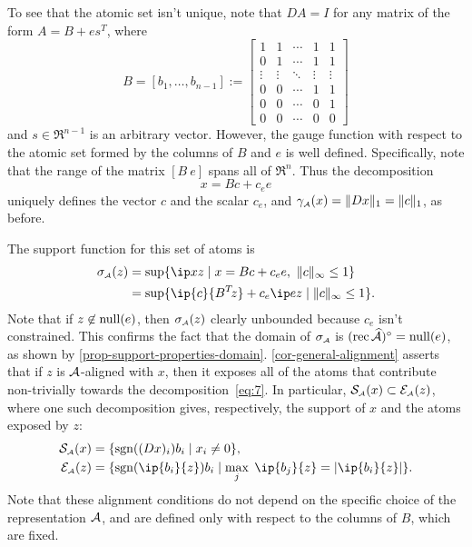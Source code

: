 \begin{example}
To see that the atomic set isn't unique, note that $DA = I$ for
any matrix of the form $A = B+es^T$, where 
\begin{equation*}
B = [b_1,\ldots,b_{n-1}] := \begin{bmatrix}
1 & 1 & \cdots & 1&1\\
0 & 1  & \cdots & 1&1 \\
\vdots  & \vdots & \ddots & \vdots  &\vdots\\
0 & 0  & \cdots & 1 & 1\\
0 & 0  & \cdots & 0 & 1\\
0 & 0  & \cdots & 0 & 0
\end{bmatrix}
\end{equation*}
and $s\in \Re^{n-1}$ is an arbitrary vector.  However, the gauge
function with respect to the atomic set formed by the columns of $B$ and $e$ 
is well defined. Specifically, note that the range of the matrix $[B\ e]$
spans all of $\Re^n$. Thus the decomposition
\begin{equation}\label{eq:7}
  x = Bc+c_ee
\end{equation}
uniquely defines the vector $c$ and the scalar $c_e$, and
$\gamma_{\scriptscriptstyle\mathcal{A}}(x) = \|Dx\|_1 = \|c\|_1$, as before.

The support function for this set of atoms is
\begin{align*}
  \sigma\As(z)
  &= \sup\{\ip x z \mid x = Bc+c_ee,\ \infnorm{c}\le1\}
\\&= \sup\{\ip{c}{B\T z} + c_e\ip e z \mid \infnorm{c}\le1 \}.
\end{align*}
Note that if $z\not\in\operatorname{null}(e)$, then $\sigma_{\scriptscriptstyle\mathcal{A}}(z)$ clearly unbounded because
$c_e$ isn't constrained. This confirms the fact that the domain of $\sigma_{\scriptscriptstyle\mathcal{A}}$
is $(\operatorname{rec}\widehat{\mathcal{A}})^\circ=\operatorname{null}(e)$, as shown by
\autoref{prop-support-properties-domain}. \autoref{cor-general-alignment} asserts that
if $z$ is $\mathcal{A}$-aligned with $x$, then it exposes all of the atoms that
contribute non-trivially towards the decomposition~\eqref{eq:7}. In particular,
$\operatorname{\mathcal{S}_{\scriptscriptstyle\mathcal{A}}}(x)\subset\mathcal{E}_{\scriptscriptstyle\mathcal{A}}(z)$, where one such decomposition gives, respectively,
the support of $x$ and the atoms exposed by $z$:
\begin{align*}
  \suppa(x) &= \{ \sgn((Dx)_i) b_i \mid x_i \ne 0 \},
\\\Escr\As(z) &= \{\sgn(\ip{b_i}{z}) b_i \mid \max_j\; \ip{b_j}{z} = \abs{\ip{b_i}{z}} \}.
\end{align*}
Note that these alignment conditions do not depend on the specific
choice of the representation $\mathcal{A}$, and are defined only with
respect to the columns of $B$, which are fixed.
\end{example}

